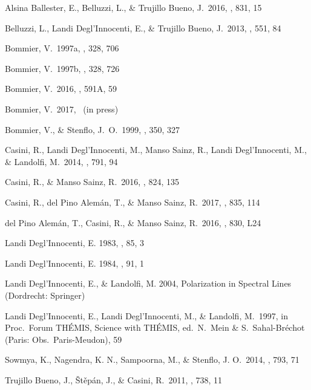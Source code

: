 \documentclass[preprint]{aastex}
\newcommand{\<}{{\kern-5pt}}
\begin{document}
\begin{thebibliography}

Alsina Ballester, E., Belluzzi, L., \& Trujillo Bueno, J.~2016,
\apjl, 831, 15

Belluzzi, L., Landi Degl'Innocenti, E., \& Trujillo Bueno, J.~2013,
\aap, 551, 84

Bommier, V.~1997a, \aap, 328, 706

Bommier, V.~1997b, \aap, 328, 726

Bommier, V.~2016, \aap, 591A, 59

Bommier, V.~2017, \aap\ (in press)

Bommier, V., \& Stenflo, J.~O.~1999, \aap, 350, 327

Casini, R., Landi Degl'Innocenti, M., Manso Sainz, R., Landi Degl'Innocenti, M., 
\& Landolfi, M.~2014, \apj, 791, 94

Casini, R., \& Manso Sainz, R.~2016, \apj, 824, 135

Casini, R., del Pino Alem\'an, T., \& Manso Sainz, R.~2017, \apj, 835, 114

del Pino Alem\'an, T., Casini, R., \& Manso Sainz, R.~2016, \apjl, 830, L24

Landi Degl'Innocenti, E. 1983, \solphys, 85, 3

Landi Degl'Innocenti, E. 1984, \solphys, 91, 1

Landi Degl'Innocenti, E., \& Landolfi, M. 2004, Polarization in
Spectral Lines (Dordrecht: Springer)

Landi Degl'Innocenti, E., Landi Degl'Innocenti, M., \& Landolfi, M.\ 1997, 
in Proc.~Forum TH\'EMIS, Science with TH\'EMIS, ed.~N.~Mein \& 
S.~Sahal-Br\'echot (Paris: Obs.~Paris-Meudon), 59

Sowmya, K., Nagendra, K. N., Sampoorna, M., \& Stenflo, J. O.~2014,
\apj, 793, 71

Trujillo Bueno, J., \v{S}t\v{e}p\'an, J., \& Casini, R.~2011, \apjl,
738, 11

\end{thebibliography}
\end{document}
